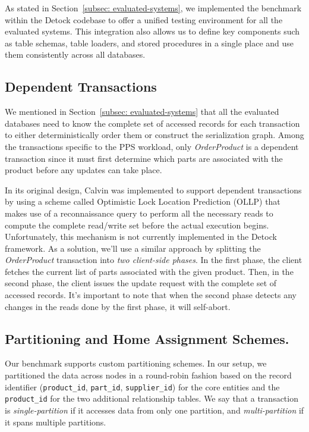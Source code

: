 As stated in Section~\ref{subsec: evaluated-systems}, we implemented the benchmark within the Detock codebase to offer a unified testing environment for all the evaluated systems. This integration also allows us to define key components such as table schemas, table loaders, and stored procedures in a single place and use them consistently across all databases.

\subsection{Dependent Transactions}
\label{subsec: dependent-transactions}
We mentioned in Section~\ref{subsec: evaluated-systems} that all the evaluated databases need to know the complete set of accessed records for each transaction to either deterministically order them or construct the serialization graph. Among the transactions specific to the PPS workload, only \textit{OrderProduct} is a dependent transaction since it must first determine which parts are associated with the product before any updates can take place. 

In its original design, Calvin was implemented to support dependent transactions by using a scheme called Optimistic Lock Location Prediction (OLLP) that makes use of a reconnaissance query to perform all the necessary reads to compute the complete read/write set before the actual execution begins. Unfortunately, this mechanism is not currently implemented in the Detock framework. As a solution, we'll use a similar approach by splitting the \textit{OrderProduct} transaction into \textit{two client-side phases}. In the first phase, the client fetches the current list of parts associated with the given product. Then, in the second phase, the client issues the update request with the complete set of accessed records. It's important to note that when the second phase detects any changes in the reads done by the first phase, it will self-abort.

\subsection{Partitioning and Home Assignment Schemes.}
\label{subsec: partitioning-and-home-assignment-schemes}
Our benchmark supports custom partitioning schemes. In our setup, we partitioned the data across nodes in a round-robin fashion based on the record identifier (\texttt{product\_id}, \texttt{part\_id}, \texttt{supplier\_id}) for the core entities and the \texttt{product\_id} for the two additional relationship tables. We say that a transaction is \textit{single-partition} if it accesses data from only one partition, and \textit{multi-partition} if it spans multiple partitions.

